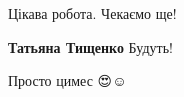  
 
 
 
 

\qqSecCmt


Цікава робота. Чекаємо ще!

\textbf{Татьяна Тищенко} Будуть!


Просто цимес 😍☺️
